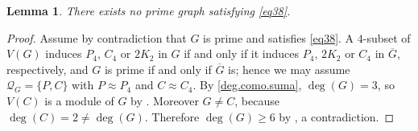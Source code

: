 \documentclass[11pt]{article}
\newtheorem{lemma}[lemma]{Lemma}
\begin{document}
%
%	

\begin{lemma}
	\label{no.existe.deg3.primo}
	There exists no prime graph satisfying \eqref{eq38}.
\end{lemma}

\begin{proof}
	Assume by contradiction that $G$ is prime and satisfies \eqref{eq38}. A
	$4$-subset of $V(G)$ induces $P_4$, $C_4$ or $2K_2$ in $G$ if and only if
	it induces $P_4$, $2K_2$ or $C_4$ in $\overline{G}$, respectively, and $G$
	is prime if and only if $\overline{G}$ is; hence we may assume
	$\mathcal{Q}_G=\{P,C\}$ with $P\approx P_4$ and $C\approx C_4$. By
	\eqref{deg.como.suma}, $\deg(G)=3$, so $V(C)$ is a module
	of $G$ by . Moreover $G\neq C$, because
	$\deg(C)=2\neq\deg(G)$. Therefore $\deg(G)\geq 6$ by
	, a contradiction.
\end{proof}
\end{document}
